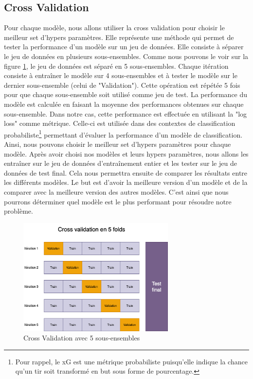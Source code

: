 \documentclass[12pt]{article}
\begin{document}
\subsection{Cross Validation}
\label{sec:cross_validation}
Pour chaque modèle, nous allons utiliser la cross validation pour choisir le meilleur set d'hypers paramètres.
Elle représente une méthode qui permet de tester la performance d'un modèle sur un jeu de données.
Elle consiste à séparer le jeu de données en plusieurs sous-ensembles.
Comme nous pouvons le voir sur la figure \ref{fig:cross_validation}, le jeu de données est séparé en 5 sous-ensembles.
Chaque itération consiste à entraîner le modèle sur 4 sous-ensembles et à tester le modèle sur le dernier sous-ensemble (celui de "Validation").
Cette opération est répétée 5 fois pour que chaque sous-ensemble soit utilisé comme jeu de test.
La performance du modèle est calculée en faisant la moyenne des performances obtenues sur chaque sous-ensemble.
Dans notre cas, cette performance est effectuée en utilisant la "log loss" comme métrique.
Celle-ci est utilisée dans des contextes de classification probabiliste\footnote{Pour rappel, le xG est une métrique probabiliste puisqu'elle indique la chance qu'un tir soit transformé en but sous forme de pourcentage.} permettant d'évaluer la performance d'un modèle de classification.
Ainsi, nous pouvons choisir le meilleur set d'hypers paramètres pour chaque modèle.
\newline\newline
Après avoir choisi nos modèles et leurs hypers paramètres, nous allons les entraîner sur le jeu de données d'entraînement entier et les tester sur le jeu de données de test final.
Cela nous permettra ensuite de comparer les résultats entre les différents modèles.
Le but est d'avoir la meilleure version d'un modèle et de la comparer avec la meilleure version des autres modèles.
C'est ainsi que nous pourrons déterminer quel modèle est le plus performant pour résoudre notre problème.
\begin{figure}[htp]
    \centering
    \includegraphics[width=0.7\textwidth]{img/cross_validation_schema.png}
    \caption{Cross Validation avec 5 sous-ensembles}
    \label{fig:cross_validation}
\end{figure}
\newpage
\end{document}

